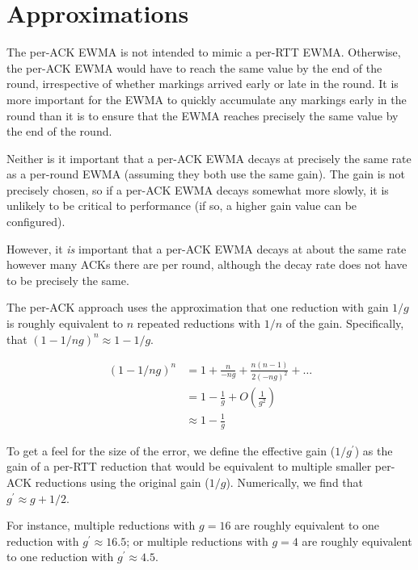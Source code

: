 \section{Approximations}\label{prresp_approx}

\balance
The per-ACK EWMA is not intended to mimic a per-RTT EWMA. Otherwise, the per-ACK
EWMA would have to reach the same value by the end of the round, irrespective of
whether markings arrived early or late in the round.
It is more important for the EWMA to quickly accumulate any markings early in
the round than it is to ensure that the EWMA reaches precisely the same value by
the end of the round. 

Neither is it important that a per-ACK EWMA decays at precisely the same rate as
a per-round EWMA (assuming they both use the same gain). The gain is not
precisely chosen, so if a per-ACK EWMA decays somewhat more slowly, it is
unlikely to be critical to performance (if so, a higher gain value can be
configured).

However, it \emph{is} important that a per-ACK EWMA decays at about the same
rate however many ACKs there are per round, although the decay rate does not
have to be precisely the same.

The per-ACK approach uses the approximation that one reduction with gain \(1/g\)
is roughly equivalent to \(n\) repeated reductions with \(1/n\) of the gain.
Specifically, that \((1 - 1/ng)^n \approx 1 - 1/g\).

\begin{align*}
(1 - 1/ng)^n &=       1 + \frac{n}{-ng} + \frac{n(n-1)}{2(-ng)^2} + \ldots \\
             &=       1 - \frac{1}{g} + O\left(\frac{1}{g^2}\right)\\
             &\approx 1 - \frac{1}{g}
\end{align*}

To get a feel for the size of the error, we define the effective gain
(\(1/g^\prime\)) as the gain of a per-RTT reduction that would be equivalent to
multiple smaller per-ACK reductions using the original gain (\(1/g\)).
Numerically, we find that \(g^\prime \approx g + 1/2\).

For instance, multiple reductions with \(g=16\) are roughly equivalent to one
reduction with \(g^\prime\approx16.5\); or multiple reductions with \(g=4\) are
roughly equivalent to one reduction with \(g^\prime\approx4.5\).

